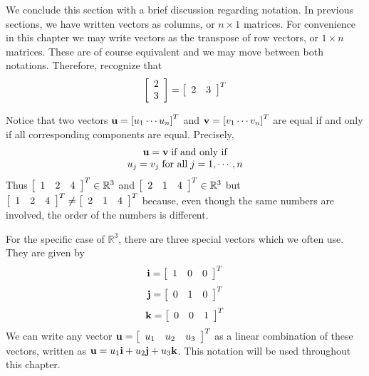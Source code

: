 We conclude this section with a brief discussion regarding notation. In previous sections, we have written vectors as columns, or $n \times 1$ matrices. For convenience in this chapter we may write vectors as the transpose of row vectors, or $1 \times n$ matrices. These are of course equivalent and we may move between both notations. Therefore, recognize that 
\[
\left[
\begin{array}{r}
2 \\
3
\end{array}
\right]  = \left[
\begin{array}{rr}
2 & 3
\end{array}
\right]^T 
\]

Notice that two vectors $\mathbf{u} = \left[ u_{1} \cdots u_{n}\right]^T $ and
$\mathbf{v}=\left[ v_{1} \cdots v_{n}\right]^T$ are equal if and only if
all corresponding components are equal. Precisely,
\begin{equation*}
\begin{array}{c}
\mathbf{u}=\mathbf{v} \; \mbox{if and only if}\\
u_{j}=v_{j} \; \mbox{for all}\; j=1,\cdots ,n
\end{array}
\end{equation*} 
Thus 
$\left[ 
\begin{array}{rrr}
1  & 2 & 4
\end{array}
\right]^T \in \mathbb{R}^{3}$ and $\left[ 
\begin{array}{rrr}
2 & 1 & 4
\end{array}
\right]^T \in
\mathbb{R}^{3}$ but $\left[ 
\begin{array}{rrr}
1 & 2 & 4
\end{array}
\right]^T \neq \left[
\begin{array}{rrr}
2 & 1 & 4
\end{array}
\right]^T $ because,
even though the same numbers are involved, the order of the numbers is different. 

For the specific case of $\mathbb{R}^3$, there are three special vectors which we often use. 
They are given by 
\begin{equation*}
\mathbf{i} = 
\left[
\begin{array}{rrr}
1 & 0 & 0
\end{array}
\right]^T
\end{equation*}
\begin{equation*}
\mathbf{j} = 
\left[
\begin{array}{rrr}
0 & 1 & 0
\end{array}
\right]^T
\end{equation*}
\begin{equation*}
\mathbf{k} = 
\left[
\begin{array}{rrr}
0 & 0 & 1
\end{array}
\right]^T
\end{equation*}
We can write any vector $\mathbf{u} = 
\left[
\begin{array}{rrr}
u_1 & u_2 & u_3
\end{array}
\right]^T$
as a linear combination of these vectors, written as $\mathbf{u} = u_1 \mathbf{i} + u_2 \mathbf{j} + u_3 \mathbf{k}$. This notation will be used throughout 
this chapter.